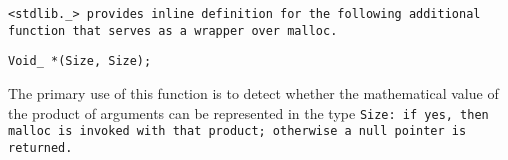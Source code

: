 \tt{<stdlib._>} provides inline definition for the following
additional function that serves as a wrapper over \tt{malloc}.

\tt{Void_ *}\tt{(Size, Size);}
\elbat

The primary use of this function is to detect whether the mathematical value of
the product of arguments can be represented in the type \tt{Size}: if yes, then
\tt{malloc} is invoked with that product; otherwise a null pointer is returned.
